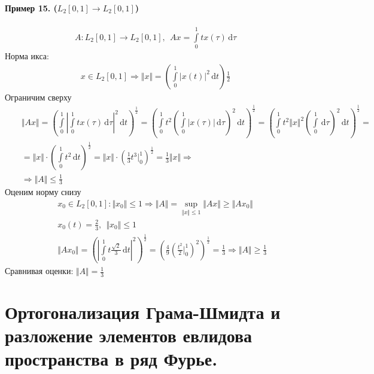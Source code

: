 \documentclass{article}[12pt]
\renewcommand{\d}{\,\mathrm{d}}
\begin{document}
\paragraph{Пример 15. ($L_{2}[0,1]\to L_{2}[0,1]$)}
\begin{eqnarray*}
    A:L_{2}[0,1]\to L_{2}[0,1]
    ,\ \ Ax=\int\limits_{0}^{1}tx(\tau)\d\tau
\end{eqnarray*}
Норма икса:
\begin{eqnarray*}
    x\in L_{2}[0,1] \Rightarrow
    \Vert x \Vert =\left(\int\limits_{0}^{1}|x(t)|^{2}\d{t}\right)\frac{1}{2}
\end{eqnarray*}
Ограничим сверху
\begin{eqnarray*}
    &&\Vert Ax \Vert =
    \left(\int\limits_{0}^{1}
    \left|\int\limits_{0}^{1}tx(\tau)\d\tau\right|^{2}\d{t}\right)^{\frac{1}{2}}
    =\left(\int\limits_{0}^{1}t^{2}
    \left(\int\limits_{0}^{1}|x(\tau)|\d\tau\right)^{2}\d{t}\right)^{\frac{1}{2}}
    =\left(\int\limits_{0}^{1}t^{2}\Vert x \Vert^{2}
    \left(\int\limits_{0}^{1}\d\tau\right)^{2}\d{t}\right)^{\frac{1}{2}}=\\
    &&=\Vert x \Vert
    \cdot\left(\int\limits_{0}^{1}t^{2}\d{t}\right)^{\frac{1}{2}}
    =\Vert x \Vert
    \cdot\left(\frac{1}{3}t^{3}\Big|^{1}_{0}\right)^{\frac{1}{2}}
    =\frac{1}{3}\Vert x \Vert \Rightarrow \\
    && \Rightarrow \Vert A \Vert \leqslant \frac{1}{3}
\end{eqnarray*}
Оценим норму снизу
\begin{eqnarray*}
    &&x_{0}\in L_{2}[0,1]:\Vert x_{0} \Vert \leqslant 1
    \Rightarrow \Vert A \Vert = \sup_{\Vert x \Vert \leqslant 1}\Vert Ax \Vert
    \geqslant \Vert Ax_{0} \Vert\\
    &&x_{0}(t)=\frac{2}{3}
    ,\ \ \Vert x_{0} \Vert \leqslant 1\\
    &&\Vert Ax_{0} \Vert =
    \left(\left|\int\limits_{0}^{1}
    t\frac{\sqrt{2}}{3}\d{t}\right|^{2}\right)^{\frac{1}{2}}
    =\left(\frac{4}{9}\left(
    \frac{t^{2}}{2}\Big|^{1}_{0}\right)^{2}\right)^{\frac{1}{2}}
    =\frac{1}{3} \Rightarrow \Vert A \Vert \geqslant \frac{1}{3}
\end{eqnarray*}
Сравнивая оценки: $\Vert A \Vert =\frac{1}{3}$

\section{Ортогонализация Грама-Шмидта и разложение элементов евлидова
пространства в ряд Фурье.}
\end{document}
